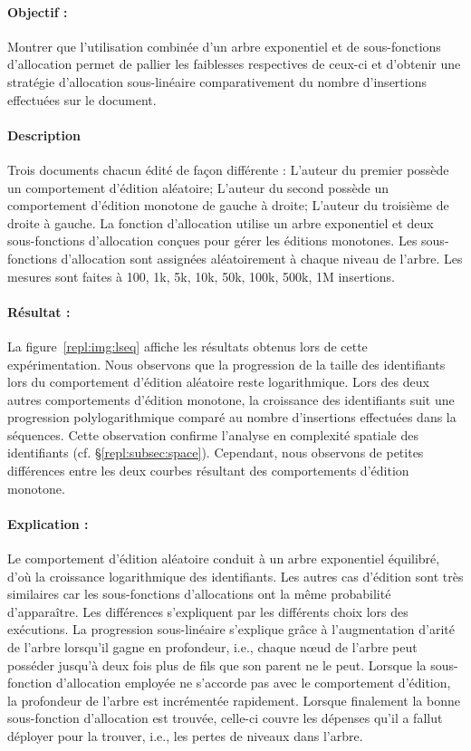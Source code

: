 \paragraph{Objectif :} Montrer que l'utilisation combinée d'un arbre exponentiel
et de sous-fonctions d'allocation permet de pallier les faiblesses respectives
de ceux-ci et d'obtenir une stratégie d'allocation sous-linéaire comparativement
du nombre d'insertions effectuées sur le document. 

\paragraph{Description} Trois documents chacun édité de façon différente :
L'auteur du premier possède un comportement d'édition aléatoire; L'auteur du
second possède un comportement d'édition monotone de gauche à droite; L'auteur
du troisième de droite à gauche. La fonction d'allocation utilise un arbre
exponentiel et deux sous-fonctions d'allocation conçues pour gérer les éditions
monotones. Les sous-fonctions d'allocation sont assignées aléatoirement à chaque
niveau de l'arbre. Les mesures sont faites à 100, 1k, 5k, 10k, 50k, 100k, 500k,
1M insertions.

\paragraph{Résultat :} La figure~\ref{repl:img:lseq} affiche les résultats
obtenus lors de cette expérimentation. Nous observons que la progression de la
taille des identifiants lors du comportement d'édition aléatoire reste
logarithmique. Lors des deux autres comportements d'édition monotone, la
croissance des identifiants suit une progression polylogarithmique comparé au
nombre d'insertions effectuées dans la séquences. Cette observation confirme
l'analyse en complexité spatiale des identifiants
(cf. §\ref{repl:subsec:space}). Cependant, nous observons de petites
différences entre les deux courbes résultant des comportements d'édition monotone.

\paragraph{Explication :} Le comportement d'édition aléatoire conduit à un arbre
exponentiel équilibré, d'où la croissance logarithmique des identifiants. Les
autres cas d'édition sont très similaires car les sous-fonctions d'allocations
ont la même probabilité d'apparaître. Les différences s'expliquent par les
différents choix lors des exécutions. La progression sous-linéaire s'explique
grâce à l'augmentation d'arité de l'arbre lorsqu'il gagne en profondeur, i.e.,
chaque nœud de l'arbre peut posséder jusqu'à deux fois plus de fils que son
parent ne le peut. Lorsque la sous-fonction d'allocation employée ne s'accorde
pas avec le comportement d'édition, la profondeur de l'arbre est incrémentée
rapidement. Lorsque finalement la bonne sous-fonction d'allocation est trouvée,
celle-ci couvre les dépenses qu'il a fallut déployer pour la trouver, i.e.,
les pertes de niveaux dans l'arbre.

